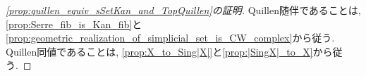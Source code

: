 \documentclass[uplatex, a4paper, 14Q, dvipdfmx]{jsarticle}
\begin{document}

\begin{proof}[\cref{prop:quillen_equiv_sSetKan_and_TopQuillen}の証明]
  Quillen随伴であることは, \cref{prop:Serre_fib_is_Kan_fib}と\cref{prop:geometric_realization_of_simplicial_set_is_CW_complex}から従う.
  Quillen同値であることは, \cref{prop:X_to_Sing|X|}と\cref{prop:|SingX|_to_X}から従う. 
\end{proof}



\end{document}
